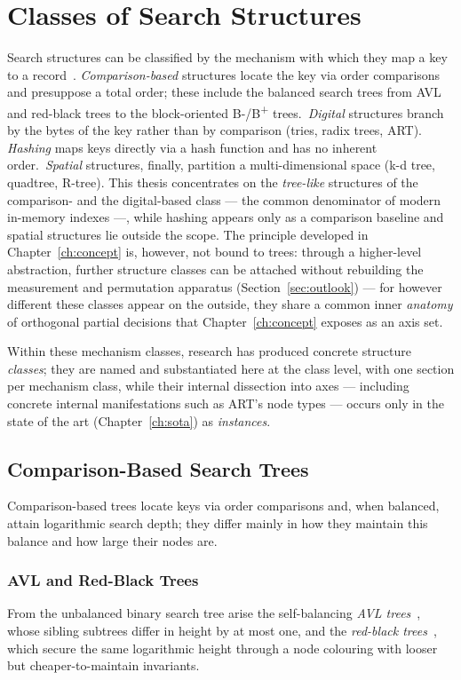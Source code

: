 \section{Classes of Search Structures}\label{sec:search-classes}
Search structures can be classified by the mechanism with which they map a key to a
record~\cite{knuth1998taocp3}\@. \emph{Comparison-based} structures locate the key via order
comparisons and presuppose a total order; these include the balanced search trees from AVL and
red-black trees to the block-oriented B-/B\textsuperscript{+} trees.\ \emph{Digital} structures
branch by the bytes of the key rather than by comparison (tries, radix trees, ART)\@. \emph{Hashing}
maps keys directly via a hash function and has no inherent order.\ \emph{Spatial} structures,
finally, partition a multi-dimensional space (k-d tree, quadtree, R-tree). This thesis concentrates
on the \emph{tree-like} structures of the comparison- and the digital-based class --- the common
denominator of modern in-memory indexes ---, while hashing appears only as a comparison baseline and
spatial structures lie outside the scope. The principle developed in Chapter~\ref{ch:concept} is,
however, not bound to trees: through a higher-level abstraction, further structure classes can be
attached without rebuilding the measurement and permutation apparatus (Section~\ref{sec:outlook})
--- for however different these classes appear on the outside, they share a common inner
\emph{anatomy} of orthogonal partial decisions that Chapter~\ref{ch:concept} exposes as an axis set.

Within these mechanism classes, research has produced concrete structure \emph{classes}; they are
named and substantiated here at the class level, with one section per mechanism class, while their
internal dissection into axes --- including concrete internal manifestations such as ART's node
types --- occurs only in the state of the art (Chapter~\ref{ch:sota}) as \emph{instances}.

\subsection{Comparison-Based Search Trees}\label{ssec:comparison-trees}
Comparison-based trees locate keys via order comparisons and, when balanced, attain logarithmic
search depth; they differ mainly in how they maintain this balance and how large their nodes are.

\subsubsection{AVL and Red-Black Trees}
From the unbalanced binary search tree arise the self-balancing
\emph{AVL trees}~\cite{adelsonvelsky1962avl}, whose sibling subtrees differ in height by at most
one, and the \emph{red-black trees}~\cite{bayer1972symmetric,guibas1978redblack}, which secure the
same logarithmic height through a node colouring with looser but cheaper-to-maintain invariants.

